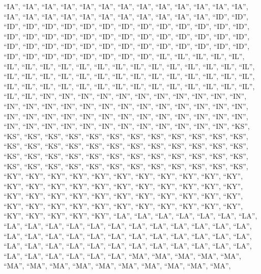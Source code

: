 \documentclass[
]{article}
\begin{document}
``IA'', ``IA'', ``IA'', ``IA'', ``IA'', ``IA'', ``IA'', ``IA'', ``IA'',
``IA'', ``IA'', ``IA'', ``IA'', ``IA'', ``IA'', ``IA'', ``IA'', ``IA'',
``IA'', ``IA'', ``IA'', ``IA'', ``IA'', ``IA'', ``ID'', ``ID'', ``ID'',
``ID'', ``ID'', ``ID'', ``ID'', ``ID'', ``ID'', ``ID'', ``ID'', ``ID'',
``ID'', ``ID'', ``ID'', ``ID'', ``ID'', ``ID'', ``ID'', ``ID'', ``ID'',
``ID'', ``ID'', ``ID'', ``ID'', ``ID'', ``ID'', ``ID'', ``ID'', ``ID'',
``ID'', ``ID'', ``ID'', ``ID'', ``ID'', ``ID'', ``ID'', ``ID'', ``ID'',
``ID'', ``ID'', ``ID'', ``ID'', ``ID'', ``ID'', ``ID'', ``ID'', ``ID'',
``ID'', ``IL'', ``IL'', ``IL'', ``IL'', ``IL'', ``IL'', ``IL'', ``IL'',
``IL'', ``IL'', ``IL'', ``IL'', ``IL'', ``IL'', ``IL'', ``IL'', ``IL'',
``IL'', ``IL'', ``IL'', ``IL'', ``IL'', ``IL'', ``IL'', ``IL'', ``IL'',
``IL'', ``IL'', ``IL'', ``IL'', ``IL'', ``IL'', ``IL'', ``IL'', ``IL'',
``IL'', ``IL'', ``IL'', ``IL'', ``IL'', ``IL'', ``IL'', ``IL'', ``IL'',
``IL'', ``IL'', ``IL'', ``IL'', ``IL'', ``IN'', ``IN'', ``IN'', ``IN'',
``IN'', ``IN'', ``IN'', ``IN'', ``IN'', ``IN'', ``IN'', ``IN'', ``IN'',
``IN'', ``IN'', ``IN'', ``IN'', ``IN'', ``IN'', ``IN'', ``IN'', ``IN'',
``IN'', ``IN'', ``IN'', ``IN'', ``IN'', ``IN'', ``IN'', ``IN'', ``IN'',
``IN'', ``IN'', ``IN'', ``IN'', ``IN'', ``IN'', ``IN'', ``IN'', ``IN'',
``IN'', ``IN'', ``IN'', ``IN'', ``IN'', ``IN'', ``IN'', ``IN'', ``IN'',
``KS'', ``KS'', ``KS'', ``KS'', ``KS'', ``KS'', ``KS'', ``KS'', ``KS'',
``KS'', ``KS'', ``KS'', ``KS'', ``KS'', ``KS'', ``KS'', ``KS'', ``KS'',
``KS'', ``KS'', ``KS'', ``KS'', ``KS'', ``KS'', ``KS'', ``KS'', ``KS'',
``KS'', ``KS'', ``KS'', ``KS'', ``KS'', ``KS'', ``KS'', ``KS'', ``KS'',
``KS'', ``KS'', ``KS'', ``KS'', ``KS'', ``KS'', ``KS'', ``KS'', ``KS'',
``KS'', ``KS'', ``KS'', ``KS'', ``KY'', ``KY'', ``KY'', ``KY'', ``KY'',
``KY'', ``KY'', ``KY'', ``KY'', ``KY'', ``KY'', ``KY'', ``KY'', ``KY'',
``KY'', ``KY'', ``KY'', ``KY'', ``KY'', ``KY'', ``KY'', ``KY'', ``KY'',
``KY'', ``KY'', ``KY'', ``KY'', ``KY'', ``KY'', ``KY'', ``KY'', ``KY'',
``KY'', ``KY'', ``KY'', ``KY'', ``KY'', ``KY'', ``KY'', ``KY'', ``KY'',
``KY'', ``KY'', ``KY'', ``KY'', ``KY'', ``KY'', ``KY'', ``KY'', ``LA'',
``LA'', ``LA'', ``LA'', ``LA'', ``LA'', ``LA'', ``LA'', ``LA'', ``LA'',
``LA'', ``LA'', ``LA'', ``LA'', ``LA'', ``LA'', ``LA'', ``LA'', ``LA'',
``LA'', ``LA'', ``LA'', ``LA'', ``LA'', ``LA'', ``LA'', ``LA'', ``LA'',
``LA'', ``LA'', ``LA'', ``LA'', ``LA'', ``LA'', ``LA'', ``LA'', ``LA'',
``LA'', ``LA'', ``LA'', ``LA'', ``LA'', ``LA'', ``LA'', ``LA'', ``LA'',
``LA'', ``LA'', ``LA'', ``MA'', ``MA'', ``MA'', ``MA'', ``MA'', ``MA'',
``MA'', ``MA'', ``MA'', ``MA'', ``MA'', ``MA'', ``MA'', ``MA'', ``MA'',
\end{document}
